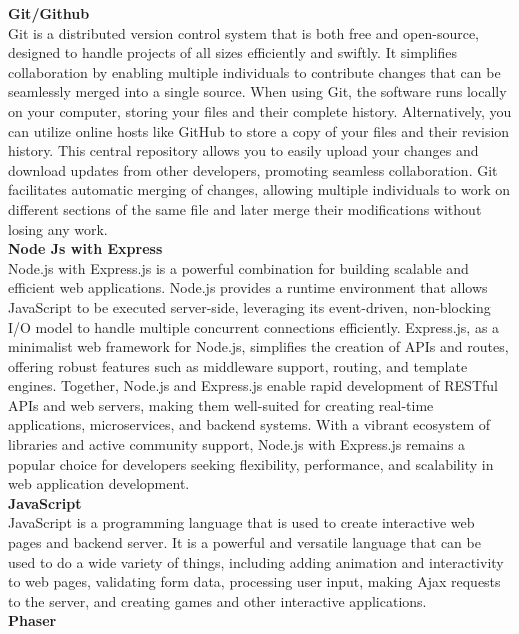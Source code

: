 \textbf{Git/Github}\\
Git is a distributed version control system that is both free and open-source, designed to handle projects of all sizes efficiently and swiftly. It simplifies collaboration by enabling multiple individuals to contribute changes that can be seamlessly merged into a single source. When using Git, the software runs locally on your computer, storing your files and their complete history. Alternatively, you can utilize online hosts like GitHub to store a copy of your files and their revision history. This central repository allows you to easily upload your changes and download updates from other developers, promoting seamless collaboration. Git facilitates automatic merging of changes, allowing multiple individuals to work on different sections of the same file and later merge their modifications without losing any work.\\
\textbf{Node Js with Express}\\
Node.js with Express.js is a powerful combination for building scalable and efficient web applications. Node.js provides a runtime environment that allows JavaScript to be executed server-side, leveraging its event-driven, non-blocking I/O model to handle multiple concurrent connections efficiently. Express.js, as a minimalist web framework for Node.js, simplifies the creation of APIs and routes, offering robust features such as middleware support, routing, and template engines. Together, Node.js and Express.js enable rapid development of RESTful APIs and web servers, making them well-suited for creating real-time applications, microservices, and backend systems. With a vibrant ecosystem of libraries and active community support, Node.js with Express.js remains a popular choice for developers seeking flexibility, performance, and scalability in web application development.\\
\textbf{JavaScript}\\
JavaScript is a programming language that is used to create interactive web pages and backend server. It is a powerful and versatile language that can be used to do a wide variety of things, including adding animation and interactivity to web pages, validating form data, processing user input, making Ajax requests to the server, and creating games and other interactive applications.\\
\textbf{Phaser}\\
